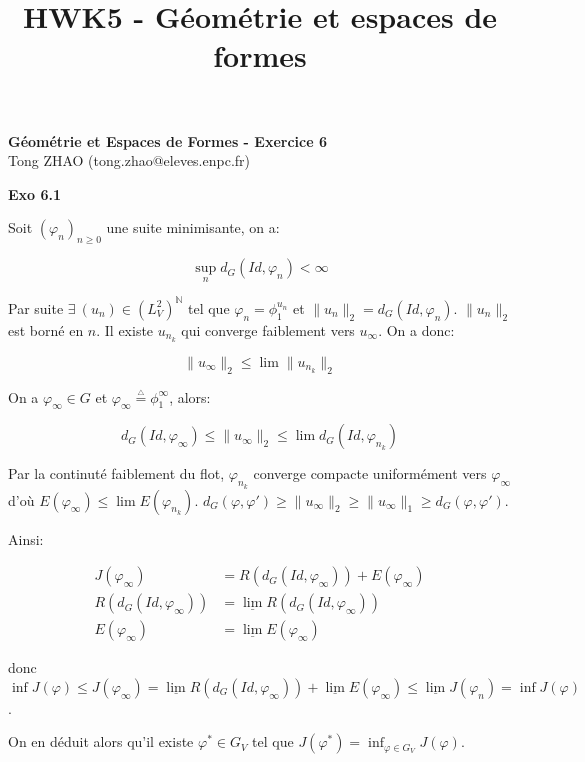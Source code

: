 \documentclass[11pt]{article}
\begin{document}
    
    \title{HWK5 - Géométrie et espaces de formes}
    
    \thispagestyle{empty}
    
    \begin{center}
    {\LARGE \bf Géométrie et Espaces de Formes - Exercice 6}\\
    \vspace{1em}
    {\large Tong ZHAO (tong.zhao@eleves.enpc.fr)}\\
    \end{center}

    \textbf{Exo 6.1}

    Soit $(\varphi_n)_{n \ge 0}$ une suite minimisante, on a: 

    \vspace{-3em} 
    $$\sup_n d_{G} (Id, \varphi_n) < \infty$$
    \vspace{-4em}

    Par suite $\exists\ (u_n) \in (L^2_V)^\mathbb{N}$ tel que $\varphi_n = \phi_1^{u_n}$
    et $\|u_n\|_2 = d_{G} (Id, \varphi_n)$. $\|u_n\|_2$ est borné en $n$. Il existe $u_{n_k}$ qui converge faiblement vers $u_\infty$.
    On a donc: 
    
    \vspace{-3em}
    $$\|u_\infty\|_2 \le \lim \|u_{n_k}\|_2$$
    \vspace{-4em}
    
    On a $\varphi_\infty \in G $ et $\varphi_\infty \overset{\underset{\triangle}{}}{=} \phi_1^\infty$, alors:
    
    \vspace{-3em}
    $$d_{G} (Id, \varphi_\infty) \le \|u_\infty\|_2 \le \lim d_{G}(Id, \varphi_{n_k})$$
    \vspace{-4em}

    Par la continuté faiblement du flot, $\varphi_{n_k}$ converge compacte uniformément vers $\varphi_\infty$
    d'où $E(\varphi_\infty) \le \lim E(\varphi_{n_k})$. $ d_{G} (\varphi, \varphi') \ge \|u_\infty\|_2 \ge \|u_\infty\|_1 \ge d_G(\varphi, \varphi')$.
    
    Ainsi:

    \vspace{-5em}
    \begin{align*}
      J(\varphi_\infty) &= R(d_{G}(Id, \varphi_\infty)) + E(\varphi_\infty) \\
      R(d_{G}(Id, \varphi_\infty)) &= \underline{\lim} R(d_{G} (Id, \varphi_\infty)) \\
      E(\varphi_\infty) &= \underline{\lim} E(\varphi_\infty)
    \end{align*}
    \vspace{-4em}

    donc $\inf J(\varphi) \le J(\varphi_\infty) = \underline{\lim} R(d_{G} (Id, \varphi_\infty)) + \underline{\lim} E(\varphi_\infty) \le \underline{\lim} J(\varphi_n) = \inf J(\varphi)$.

    On en déduit alors qu'il existe $\varphi^* \in G_V$ tel que $J(\varphi^*) = \inf_{\varphi \in G_V} J(\varphi)$.
\end{document}

